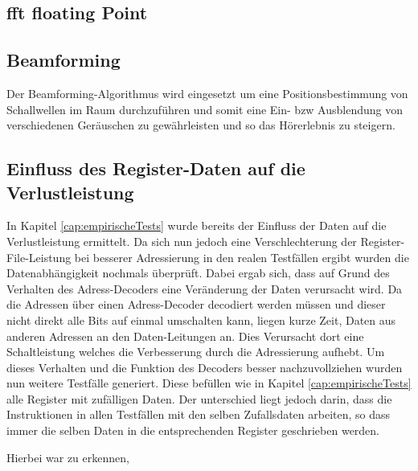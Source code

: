 \subsection{fft floating Point}



\subsection{Beamforming}
Der Beamforming-Algorithmus wird eingesetzt um eine Positionsbestimmung von Schallwellen im Raum durchzuführen und somit eine Ein- bzw Ausblendung von verschiedenen Geräuschen zu gewährleisten und so das Hörerlebnis zu steigern. 

 


\subsection{Einfluss des Register-Daten auf die Verlustleistung}
In Kapitel \ref{cap:empirischeTests} wurde bereits der Einfluss der Daten auf die Verlustleistung ermittelt. Da sich nun jedoch eine Verschlechterung der Register-File-Leistung bei besserer Adressierung in den realen Testfällen ergibt wurden die Datenabhängigkeit nochmals überprüft. Dabei ergab sich, dass auf Grund des Verhalten des Adress-Decoders eine Veränderung der Daten verursacht wird. Da die Adressen über einen Adress-Decoder decodiert werden müssen und dieser nicht direkt alle Bits auf einmal umschalten kann, liegen kurze Zeit, Daten aus anderen Adressen an den Daten-Leitungen an. Dies Verursacht dort eine Schaltleistung welches die Verbesserung durch die Adressierung aufhebt.
Um dieses Verhalten und die Funktion des Decoders besser nachzuvollziehen wurden nun weitere Testfälle generiert. Diese befüllen wie in Kapitel \ref{cap:empirischeTests} alle Register mit zufälligen Daten. Der unterschied liegt jedoch darin, dass die Instruktionen in allen Testfällen mit den selben Zufallsdaten arbeiten, so dass immer die selben Daten in die entsprechenden Register geschrieben werden.

Hierbei war zu erkennen, 

